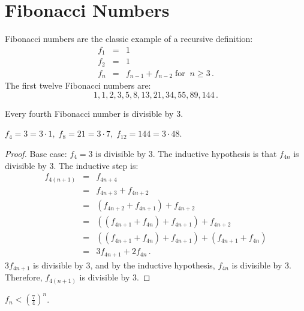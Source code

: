 
\section{Fibonacci Numbers}\label{s.induction-fibonacci}
Fibonacci numbers are the classic example of a recursive definition:
\begin{eqnarray*}
f_1 &=& 1\\
f_2 &=& 1\\
f_n &=& f_{n-1} + f_{n-2}\; \textrm{for} \;\; n \geq 3\,.
\end{eqnarray*}
The first twelve Fibonacci numbers are:
\[
1, 1, 2, 3, 5, 8, 13, 21, 34, 55, 89, 144\,.
\]
\begin{theorem}\label{thm.fib-div3}
Every fourth Fibonacci number is divisible by $3$.
\end{theorem}

\begin{example}
$f_4=3=3\cdot 1,\; f_8=21=3\cdot 7,\; f_{12}=144=3\cdot 48$.
\end{example}

\begin{proof}
Base case: $f_4=3$ is divisible by $3$. The inductive hypothesis is that $f_{4n}$ is divisible by $3$. The inductive step is:
\begin{eqnarray*}
f_{4(n+1)} &=& f_{4n+4}\\
&=& f_{4n+3}+f_{4n+2}\\
&=& (f_{4n+2}+f_{4n+1})+f_{4n+2}\\
&=& ((f_{4n+1}+f_{4n})+f_{4n+1})+f_{4n+2}\\
&=& ((f_{4n+1}+f_{4n})+f_{4n+1})+(f_{4n+1}+f_{4n})\\
&=& 3f_{4n+1}+2f_{4n}\,.
\end{eqnarray*}
$3f_{4n+1}$ is divisible by $3$, and by the inductive hypothesis, $f_{4n}$ is divisible by $3$. Therefore, $f_{4(n+1)}$ is divisible by $3$.
\end{proof}

\begin{theorem}\label{thm.seven-fourths}
$f_n < \left(\displaystyle\frac{7}{4}\right)^n$.
\end{theorem}

